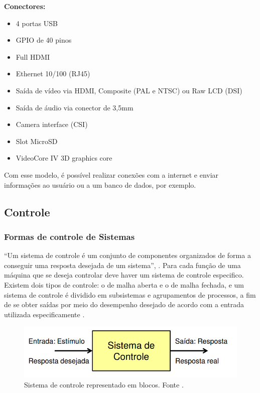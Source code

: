   \textbf{Conectores:}
  \begin{itemize}                                                     
    \item 4 portas USB
    \item GPIO de 40 pinos
    \item Full HDMI
    \item Ethernet 10/100 (RJ45)
    \item Saída de vídeo via HDMI, Composite (PAL e NTSC) ou Raw LCD (DSI)
    \item Saída de áudio via conector de 3,5mm
    \item Camera interface (CSI)
    \item Slot MicroSD
    \item VideoCore IV 3D graphics core
  \end{itemize}

  Com esse modelo, é possível realizar conexões com a internet e enviar informações ao usuário ou a um banco de dados, por exemplo.

\subsection{Controle} %
	\label{sub:controle}

	\subsubsection{Formas de controle de Sistemas}

		“Um sistema de controle é um conjunto de componentes organizados de forma a conseguir uma resposta desejada de um sistema”, \cite{mello}. Para cada função de uma máquina que se deseja controlar deve haver um sistema de controle especifico. Existem dois tipos de controle: o de malha aberta e o de malha fechada, e um sistema de controle é dividido em subsistemas e agrupamentos de processos, a fim de se obter saídas por meio do desempenho desejado de acordo com a entrada utilizada especificamente \cite{mello}.

		\begin{figure}[H]
			\centering
			\includegraphics[scale=0.5]{figuras/sistema_controle.png}
			\caption{Sistema de controle representado em blocos. Fonte \cite{mello}.}
			\label{img:sistema_controle}
		\end{figure}

